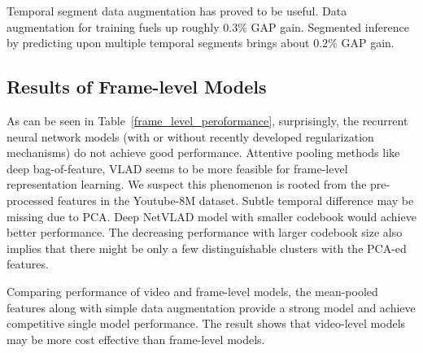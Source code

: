 \documentclass[10pt,twocolumn,letterpaper]{article}
\begin{document}
Temporal segment data augmentation has proved to be useful. Data augmentation for training fuels up roughly $0.3\%$ GAP gain. Segmented inference by predicting upon multiple temporal segments brings about $0.2\%$ GAP gain.








\subsection{Results of Frame-level Models}
As can be seen in Table~\ref{frame_level_peroformance}, surprisingly, the recurrent neural network models (with or without recently developed regularization mechanisms) do not achieve good performance. Attentive pooling methods like deep bag-of-feature, VLAD seems to be more feasible for frame-level representation learning. We suspect this phenomenon is rooted from the pre-processed features in the Youtube-8M dataset. Subtle temporal difference may be missing due to PCA. Deep NetVLAD model with smaller codebook would achieve better performance. The decreasing performance with larger codebook size also implies that there might be only a few distinguishable clusters with the PCA-ed features.

Comparing performance of video and frame-level models, the mean-pooled features along with simple data augmentation provide a strong model and achieve competitive single model performance. The result shows that video-level models may be more cost effective than frame-level models.
\end{document}
